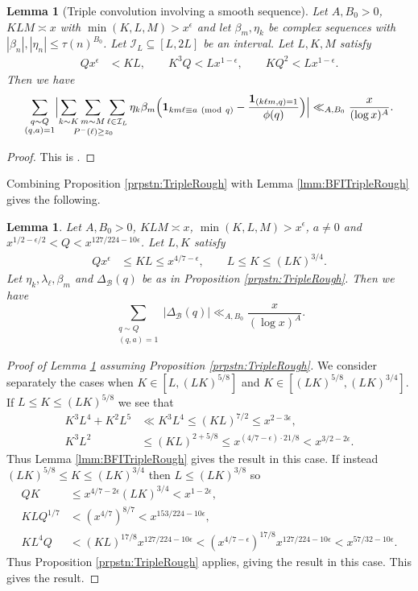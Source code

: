 \documentclass[10pt]{amsart}
\theoremstyle{plain}
\newtheorem{lmm}[thrm]{Lemma}
\numberwithin{equation}{section}
\newcommand{\Mod}[1]{\ (\mathrm{mod}\ #1)}
\begin{document}
\begin{lmm}[Triple convolution involving a smooth sequence]\label{lmm:TripleSmooth}
Let $A,B_0>0$,  $ K L M\asymp x$ with $\min(K,L,M)>x^{\epsilon}$ and let $\beta_m,\eta_k$ be complex sequences with $|\beta_n|,|\eta_n|\le \tau(n)^{B_0}$. Let $\mathcal{I}_L\subseteq [L,2L]$ be an interval. Let $L,K,M$ satisfy
\begin{align*}
Q x^\epsilon&<KL,\qquad
K^3Q<L x^{1-\epsilon},\qquad
KQ^2<L x^{1-\epsilon}.
\end{align*}
Then we have
\[
\sum_{\substack{q\sim Q\\ (q,a)=1}}\Bigl|\mathop{\sum_{k\sim K}\sum_{m\sim M}\sum_{\substack{\ell\in\mathcal{I}_L }}}\limits_{P^-(\ell)\ge z_0}\eta_k\beta_m\Bigl(\mathbf{1}_{k m \ell\equiv a\Mod{q} }-\frac{\mathbf{1}_{(k \ell m,q)=1}}{\phi(q)}\Bigr)\Bigr|\ll_{A,B_0} \frac{x}{(\log{x})^A}.
\]
\end{lmm}
%
%
%
%
\begin{proof}
This is \cite[Theorem 5*]{BFI2}.
\end{proof}
%
%
%
%
%
%
%
%
Combining Proposition \ref{prpstn:TripleRough} with Lemma \ref{lmm:BFITripleRough} gives the following.
%
%
%
%
%
%
%
%
\begin{lmm}\label{lmm:TripleCombined}
Let $A,B_0>0$, $K L M\asymp x$, $\min(K,L,M)>x^\epsilon$, $a\ne 0$ and $x^{1/2-\epsilon/2}<Q<x^{127/224-10\epsilon}$. Let $L,K$ satisfy
\begin{align*}
Q x^\epsilon&\le KL\le x^{4/7-\epsilon},\qquad
L\le K\le (L K)^{3/4}.
\end{align*}
Let $\eta_k,\lambda_\ell,\beta_m$ and $\Delta_{\mathscr{B}}(q)$ be as in Proposition \ref{prpstn:TripleRough}. Then we have
\[
\sum_{\substack{q\sim Q\\ (q,a)=1}}|\Delta_{\mathscr{B}}(q)|\ll_{A,B_0} \frac{x}{(\log{x})^A}.
\]
\end{lmm}
%
%
%
%
%
%
%
%
\begin{proof}[Proof of Lemma \ref{lmm:TripleCombined} assuming Proposition \ref{prpstn:TripleRough}]
We consider separately the cases when $K\in [L,(L K)^{5/8}]$ and $K\in [(L K)^{5/8},(L K)^{3/4}]$. If $L\le K\le (L K)^{5/8}$ we see that
\begin{align*}
K^3L^4+K^2L^5&\ll K^3L^4\le (KL)^{7/2}\le x^{2-3\epsilon},\\
K^3L^2 &\le (KL)^{2+5/8}\le x^{(4/7-\epsilon)\cdot 21/8}< x^{3/2-2\epsilon}.
\end{align*}
Thus Lemma \ref{lmm:BFITripleRough} gives the result in this case. If instead $(L K)^{5/8}\le K\le (L K)^{3/4}$ then $L\le (L K)^{3/8}$ so
\begin{align*}
Q K&\le x^{4/7-2\epsilon} (LK)^{3/4}<x^{1-2\epsilon},\\
KLQ^{1/7}&<(x^{4/7})^{8/7}<x^{153/224-10\epsilon},\\
K L^{4} Q&<(KL)^{17/8}x^{127/224-10\epsilon}<(x^{4/7-\epsilon})^{17/8}x^{127/224-10\epsilon} <x^{57/32-10\epsilon}.
\end{align*}
Thus Proposition \ref{prpstn:TripleRough} applies, giving the result in this case. This gives the result.
\end{proof}
\end{document}
